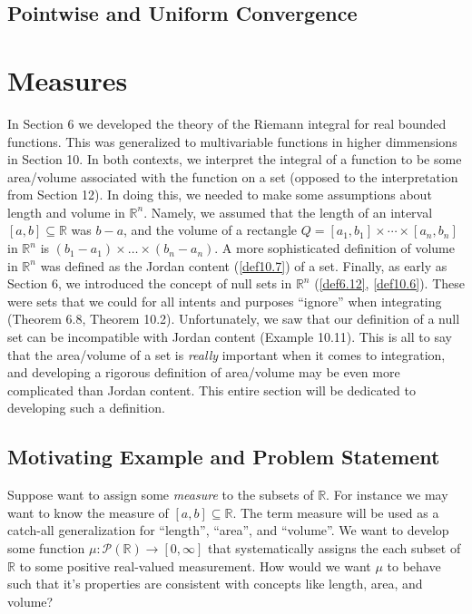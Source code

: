 \documentclass{article}
\newcommand{\R}{\mathbb{R}}
\theoremstyle{definition}
\begin{document}
	\subsection{Pointwise and Uniform Convergence}
	
	\section{Measures}
	In Section 6 we developed the theory of the Riemann integral for real bounded functions. This was generalized to multivariable functions in higher dimmensions in Section 10. In both contexts, we interpret the integral of a function to be some area/volume associated with the function on a set (opposed to the interpretation from Section 12). In doing this, we needed to make some assumptions about length and volume in $\R^n$. Namely, we assumed that the length of an interval $[a,b]\subseteq \R$ was $b-a$, and the volume of a rectangle $Q = [a_1,b_1]\times \cdots \times [a_n,b_n]$ in $\R^n$ is $(b_1-a_1)\times \ldots \times (b_n-a_n)$. A more sophisticated definition of volume in $\R^n$ was defined as the Jordan content (\cref{def10.7}) of a set. Finally, as early as Section 6, we introduced the concept of null sets in $\R^n$ (\cref{def6.12}, \cref{def10.6}). These were sets that we could for all intents and purposes ``ignore'' when integrating (Theorem 6.8, Theorem 10.2). Unfortunately, we saw that our definition of a null set can be incompatible with Jordan content (Example 10.11). This is all to say that the area/volume of a set is \textit{really} important when it comes to integration, and developing a rigorous definition of area/volume may be even more complicated than Jordan content. This entire section will be dedicated to developing such a definition. 
	\subsection{Motivating Example and Problem Statement}
	Suppose want to assign some \textit{measure} to the subsets of $\R$. For instance we may want to know the measure of $[a,b]\subseteq \R$. The term measure will be used as a catch-all generalization for ``length'', ``area'', and ``volume''.  We want to develop some function $\mu:\mathcal P(\R)\to[0,\infty]$ that systematically assigns the each subset of $\R$ to some positive real-valued measurement. How would we want $\mu$ to behave such that it's properties are consistent with concepts like length, area, and volume? 
	
\end{document}
